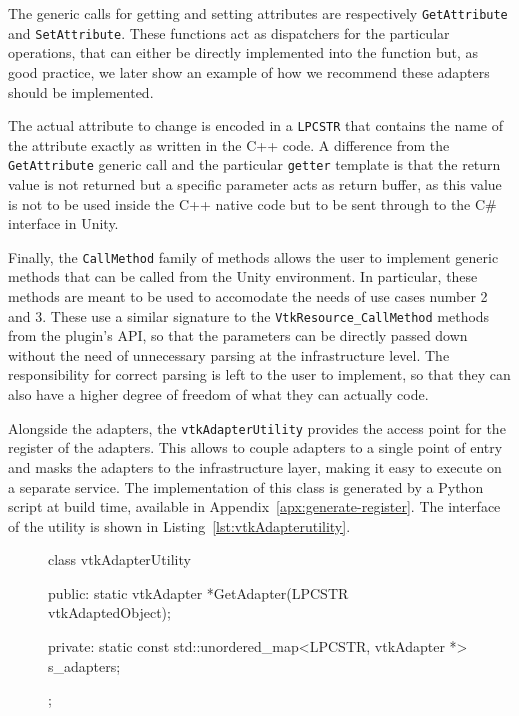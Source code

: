 The generic calls for getting and setting attributes are respectively \verb|GetAttribute| and \verb|SetAttribute|. These functions act as dispatchers for the particular operations, that can either be directly implemented into the function but, as good practice, we later show an example of how we recommend these adapters should be implemented.

The actual attribute to change is encoded in a \verb|LPCSTR| that contains the name of the attribute exactly as written in the C++ code. A difference from the \verb|GetAttribute| generic call and the particular \verb|getter| template is that the return value is not returned but a specific parameter acts as return buffer, as this value is not to be used inside the C++ native code but to be sent through to the C\# interface in Unity.

Finally, the \verb|CallMethod| family of methods allows the user to implement generic methods that can be called from the Unity environment. In particular, these methods are meant to be used to accomodate the needs of use cases number 2 and 3. These use a similar signature to the \verb|VtkResource_CallMethod| methods from the plugin's API, so that the parameters can be directly passed down without the need of unnecessary parsing at the infrastructure level. The responsibility for correct parsing is left to the user to implement, so that they can also have a higher degree of freedom of what they can actually code.

Alongside the adapters, the \verb|vtkAdapterUtility| provides the access point for the register of the adapters. This allows to couple adapters to a single point of entry and masks the adapters to the infrastructure layer, making it easy to execute on a separate service. The implementation of this class is generated by a Python script at build time, available in Appendix~\ref{apx:generate-register}. The interface of the utility is shown in Listing~\ref{lst:vtkAdapterutility}.

\begin{figure}[ht!]
    \centering
    \begin{cpp}[label=lst:vtkAdapterutility,caption={vtkAdapterUtility interface}]
class vtkAdapterUtility
{
public:
	static vtkAdapter *GetAdapter(LPCSTR vtkAdaptedObject);

private:
	static const std::unordered_map<LPCSTR, vtkAdapter *> s_adapters;
};
    \end{cpp}
\end{figure}


